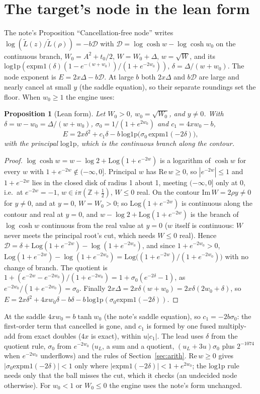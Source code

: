 \documentclass[11pt]{article}
\newtheorem{proposition}[theorem]{Proposition}
\theoremstyle{definition}
\newcommand{\Lt}{\widetilde L}
\newcommand{\Log}{\mathrm{Log}}
\newcommand{\lop}{\mathrm{log1p}}
\newcommand{\emo}{\mathrm{expm1}}
\begin{document}
\section{The target's node in the lean form}\label{sec:lean}

The note's Proposition ``Cancellation-free node'' writes $\log(\Lt(z)/\Lt(\rho))=-b\mathcal D$ with $\mathcal D=
\log\cosh w-\log\cosh w_0$ on the continuous branch, $W_0=A^2+t_0/2$, $W=W_0+\Delta$, $w=\sqrt W$, and its
$\lop(\emo(\delta)(1-e^{-(w+w_0)})/(1+e^{-2w_0}))$, $\delta=\Delta/(w+w_0)$. The node exponent is
$E=2x\Delta-b\mathcal D$. At large $b$ both $2x\Delta$ and $b\mathcal D$ are large and nearly cancel at small $y$ (the
saddle equation), so their separate roundings set the floor. When $w_0\ge1$ the engine uses:

\begin{proposition}[Lean form]\label{prop:lean}
Let $W_0>0$, $w_0=\sqrt{W_0}$, and $y\ne0$. With $\delta=w-w_0=\Delta/(w+w_0)$, $\sigma_0=1/(1+e^{2w_0})$ and
$c_1=4xw_0-b$,
\[
E=2x\delta^2+c_1\delta-b\,\lop\bigl(\sigma_0\,\emo(-2\delta)\bigr),
\]
with the principal $\lop$, which is the continuous branch along the contour.
\end{proposition}
\begin{proof}
$\log\cosh w=w-\log2+\Log(1+e^{-2w})$ is a logarithm of $\cosh w$ for every $w$ with $1+e^{-2w}\notin(-\infty,0]$.
Principal $w$ has $\mathrm{Re}\,w\ge0$, so $|e^{-2w}|\le1$ and $1+e^{-2w}$ lies in the closed disk of radius 1 about
1, meeting $(-\infty,0]$ only at 0, i.e.\ at $e^{-2w}=-1$, $w\in i\pi(\mathbb Z+\frac12)$, $W\le0$ real. On the
contour $\mathrm{Im}\,W=2\rho y\ne0$ for $y\ne0$, and at $y=0$, $W=W_0>0$; so $\Log(1+e^{-2w})$ is continuous along
the contour and real at $y=0$, and $w-\log2+\Log(1+e^{-2w})$ is the branch of $\log\cosh w$ continuous from the real
value at $y=0$ ($w$ itself is continuous: $W$ never meets the principal root's cut, which needs $W\le0$ real). Hence
$\mathcal D=\delta+\Log(1+e^{-2w})-\log(1+e^{-2w_0})$, and since $1+e^{-2w_0}>0$,
$\Log(1+e^{-2w})-\log(1+e^{-2w_0})=\Log\bigl((1+e^{-2w})/(1+e^{-2w_0})\bigr)$ with no change of branch. The quotient
is $1+(e^{-2w}-e^{-2w_0})/(1+e^{-2w_0})=1+\sigma_0(e^{-2\delta}-1)$, as $e^{-2w_0}/(1+e^{-2w_0})=\sigma_0$. Finally
$2x\Delta=2x\delta(w+w_0)=2x\delta(2w_0+\delta)$, so $E=2x\delta^2+4xw_0\delta-b\delta-b\,\lop(\sigma_0\emo(-2\delta))$.
\end{proof}
At the saddle $4xw_0=b\tanh w_0$ (the note's saddle equation), so $c_1=-2b\sigma_0$: the first-order term that
cancelled is gone, and $c_1$ is formed by one fused multiply-add from exact doubles ($4x$ is exact), within
$u|c_1|$. The lead uses $\delta$ from the quotient rule, $\sigma_0$ from $e^{-2w_0}$ ($u_L$, a sum and a quotient,
$(u_L+3u)\sigma_0$ plus $2^{-1074}$ when $e^{-2w_0}$ underflows) and the rules of Section~\ref{sec:arith}.
$\mathrm{Re}\,w\ge0$ gives $|\sigma_0\emo(-2\delta)|<1$ only where $|\emo(-2\delta)|<1+e^{2w_0}$; the $\lop$ rule
needs only that the ball misses the cut, which it checks (an undecided node otherwise). For $w_0<1$ or $W_0\le0$ the
engine uses the note's form unchanged.
\end{document}
